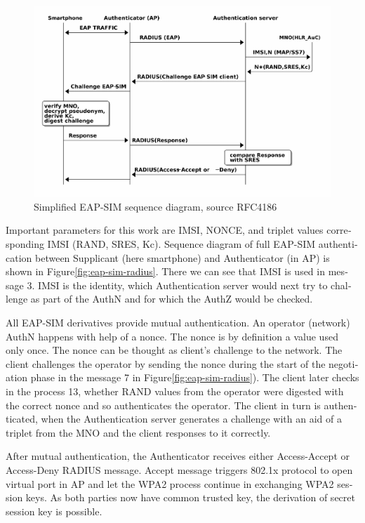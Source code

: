 \documentclass[12pt,a4paper,english]{tutthesis}
\begin{document}
\begin{otherlanguage}{english}
\begin{figure}[htb]
\centering
\includegraphics[width=.9\linewidth]{eap-sim-simple.png}
\caption{\label{fig:eap-sim-simple}Simplified EAP-SIM sequence diagram, source RFC4186}
\end{figure}








Important parameters for this work are IMSI, NONCE, and triplet values
corresponding IMSI (RAND, SRES, Kc).
Sequence diagram of full EAP-SIM authentication between Supplicant (here
smartphone) and Authenticator (in AP) is shown in
Figure\ref{fig:eap-sim-radius}. 
There we can see that IMSI is used in message 3. IMSI is the
identity, which Authentication server would next try to challenge as
part of the AuthN and for which the AuthZ would be checked.







All EAP-SIM derivatives provide mutual authentication.
An operator (network) AuthN happens with help of a nonce.
The nonce is by definition a value used only once. The nonce can
be thought as client's challenge to the network.
The client challenges the operator by sending the nonce 
during the start of the negotiation phase in the message
7 in Figure\ref{fig:eap-sim-radius}).
 The client later checks in the process
13, whether RAND values from the operator were digested with the
correct nonce and so authenticates the operator.
The client in  turn is authenticated, when the Authentication server
generates a challenge with an aid of a triplet from the MNO and the
client responses to it correctly.

After mutual authentication, the Authenticator receives either
Access-Accept or Access-Deny RADIUS message. Accept message triggers
802.1x protocol to open virtual port in AP and let the WPA2 process
continue in exchanging WPA2 session keys. As both parties now have
common trusted key, the derivation of secret session key is possible.



\end{otherlanguage}
\end{document}
